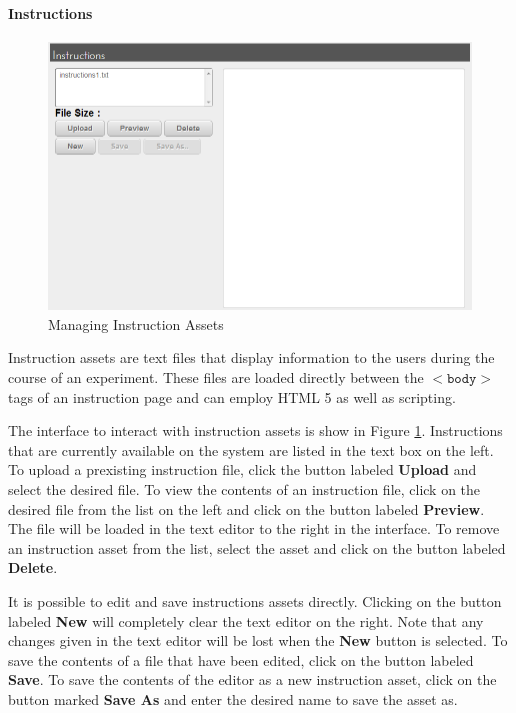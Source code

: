 \documentclass[article]{ij4uq}              %
\begin{document}
\paragraph{Instructions}

\begin{figure}[htb]
 \centering
 \includegraphics[width=5.0in]{figures/manage_instructions.png}
 \caption{Managing Instruction Assets}
 \label{fig:manageInst}
\end{figure}
\FloatBarrier

Instruction assets are text files that  display information to the users during the course of an experiment.  These files are loaded directly between the $<\texttt{body}>$ tags of an instruction page and can employ HTML 5 as well as scripting.

The interface to interact with instruction assets is show in Figure \ref{fig:manageInst}.  Instructions that are currently available on the system are listed in the text box on the left. To upload a prexisting instruction file, click the button labeled \textbf{Upload} and select the desired file.  To view the contents of an instruction file, click on the desired file from the list on the left and click on the button labeled \textbf{Preview}.  The file will be loaded in the text editor to the right in the interface.  To remove an instruction asset from the list, select the asset and click on the button labeled \textbf{Delete}.

It is possible to edit and save instructions assets directly.  Clicking on the button labeled \textbf{New} will completely clear the text editor on the right.  Note that any changes given in the text editor will be lost when the \textbf{New} button is selected.  To save the contents of a file that have been edited, click on the button labeled \textbf{Save}.  To save the contents of the editor as a new instruction asset, click on the button marked \textbf{Save As} and enter the desired name to save the asset as.
\end{document}

